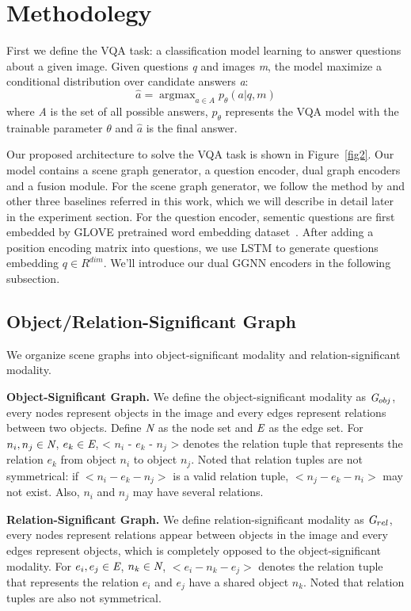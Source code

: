 \documentclass[letterpaper]{article} %
\begin{document}
\section{Methodolegy}

First we define the VQA task: a classification model learning to answer questions about a given image. Given questions \emph{q} and images \emph{m}, the model maximize a conditional distribution over candidate answers \emph{a}:
\begin{equation}
    \hat{a} = \mathop{\arg\max}_{a \in A}p_\theta(a|q, m)
\end{equation}
where \emph{A} is the set of all possible answers, $p_\theta$ represents the VQA model with the trainable parameter $\theta$ and $\hat{a}$ is the final answer.

Our proposed architecture to solve the VQA task is shown in Figure~\ref{fig2}. Our model contains a scene graph generator, a question encoder, dual graph encoders and a fusion module. For the scene graph generator, we follow the method by \cite{tang2020sggcode} and other three baselines referred in this work, which we will describe in detail later in the experiment section. 
For the question encoder, sementic questions are first embedded by GLOVE pretrained word embedding dataset~\cite{pennington-etal-2014-glove}. After adding a position encoding matrix into questions, we use LSTM to generate questions embedding $q \in R^{dim}$. We'll introduce our dual GGNN encoders in the following subsection.

\subsection{Object/Relation-Significant Graph}
We organize scene graphs into object-significant modality and relation-significant modality. 

\textbf{Object-Significant Graph.} We define the object-significant modality as $\emph{G}_{obj}$, every nodes represent objects in the image and every edges represent relations between two objects. Define $\emph{N}$ as the node set and $\emph{E}$ as the edge set. For $n_i, n_j \in \emph{N}$, $e_k \in \emph{E}$, < $n_i$ - $e_k$ - $n_j$ > denotes the relation tuple that represents the relation $e_k$ from object $n_i$ to object $n_j$. Noted that relation tuples are not symmetrical: if $<n_i - e_k - n_j>$ is a valid relation tuple,  $<n_j - e_k - n_i>$ may not exist. Also, $n_i$ and $n_j$ may have several relations. 

\textbf{Relation-Significant Graph.} We define relation-significant modality as $\emph{G}_{rel}$, every nodes represent relations appear between objects in the image and every edges represent objects, which is completely opposed to the object-significant modality. For $e_i, e_j \in \emph{E}$, $n_k \in \emph{N}$, $<e_i - n_k - e_j>$ denotes the relation tuple that represents the relation $e_i$ and $e_j$ have a shared object $n_k$. Noted that relation tuples are also not symmetrical.
\end{document}
